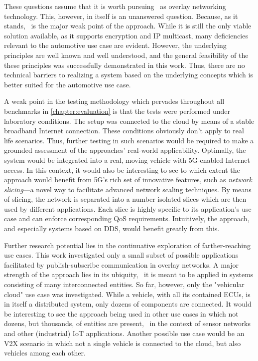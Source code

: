 These questions assume that it is worth pursuing \wnet\ as overlay networking technology. This, however, in itself is an unanswered question. Because, as it stands, \wnet\ is the major weak point of the approach. While it is still the only viable solution available, as it supports encryption and IP multicast, many deficiencies relevant to the automotive use case are evident. However, the underlying principles are well known and well understood, and the general feasibility of the these principles was successfully demonstrated in this work. Thus, there are no technical barriers to realizing a system based on the underlying concepts which is better suited for the automotive use case. 

 A weak point in the testing methodology which pervades throughout all benchmarks in \autoref{chapter:evaluation} is that the tests were performed under laboratory conditions. The setup was connected to the cloud by means of a stable broadband Internet connection. These conditions obviously don't apply to real life scenarios. Thus, further testing in such scenarios would be required to make a grounded assessment of the approaches' real-world applicability. Optimally, the system would be integrated into a real, moving vehicle with 5G-enabled Internet access. In this context, it would also be interesting to see to which extent the approach would benefit from 5G's rich set of innovative features, such as \emph{network slicing}---a novel way to facilitate advanced network scaling techniques. By means of slicing, the network is separated into a number isolated slices which are then used by different applications. Each slice is highly specific to its application's use case and can enforce corresponding QoS requirements. Intuitively, the approach, and especially systems based on DDS, would benefit greatly from this.

Further research potential lies in the continuative exploration of farther-reaching use cases. This work investigated only a small subset of possible applications facilitated by publish-subscribe communication in overlay networks. A major strength of the approach lies in its ubiquity, \ie\ it is meant to be applied in systems consisting of many interconnected entities. So far, however, only the "vehicular cloud" use case was investigated. While a vehicle, with all its contained ECUs, is in itself a distributed system, only dozens of components are connected. It would be interesting to see the approach being used in other use cases in which not dozens, but thousands, of entities are present, \eg\ in the context of sensor networks and other (industrial) IoT applications. Another possible use case would be an V2X scenario in which not a single vehicle is connected to the cloud, but also vehicles among each other.

